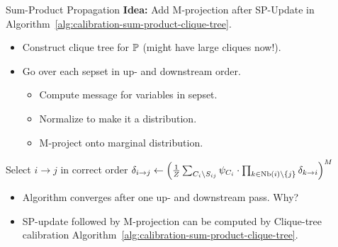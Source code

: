 \begin{frame}{Sum-Product Propagation}
\textbf{Idea:}
    Add M-projection after SP-Update in Algorithm~\ref{alg:calibration-sum-product-clique-tree}.

\begin{itemize}
    \pause \item Construct clique tree for $\Pb$ (might have large cliques now!).
    \pause \item Go over each sepset in up- and downstream order.
    \begin{itemize}
        \pause \item Compute message for variables in sepset.
        \pause \item Normalize to make it a distribution.
        \pause \item M-project onto marginal distribution.
    \end{itemize}
\end{itemize}
\pause
\begin{algorithm}[H]
   \caption{Sum-Product Propagation}
   \label{alg:calibration-sum-product-clique-tree}
    \pause
    \pause
    {
        Select $i \rightarrow j$ in correct order\;
        $\delta_{i \rightarrow j} \leftarrow \left(\frac{1}{Z} \sum_{C_i \setminus S_{ij}} \psi_{C_i} \cdot \prod_{k \in \text{Nb}(i) \backslash \{j\}} \delta_{k \rightarrow i} \right)^M$\;
    }
\end{algorithm}
\begin{itemize}
    \pause \item Algorithm converges after one up- and downstream pass. \pause Why?
    \pause \item SP-update followed by M-projection can be computed by Clique-tree calibration Algorithm~\ref{alg:calibration-sum-product-clique-tree}.
\end{itemize}
\end{frame}


